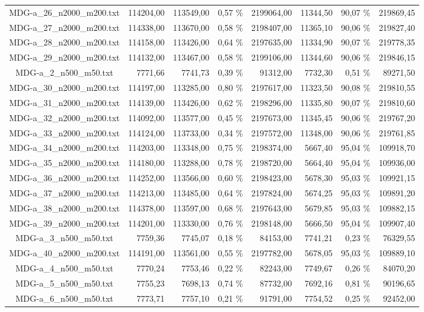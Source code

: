 \begin{landscape}
\begin{table}[ht]
\begin{tabular}{| c | r | r | r | r | r | r | r |  }
		MDG-a\_26\_n2000\_m200.txt&114204,00&113549,00&0,57 \%&2199064,00&11344,50&90,07 \%&219869,45\\
		MDG-a\_27\_n2000\_m200.txt&114338,00&113670,00&0,58 \%&2198407,00&11365,10&90,06 \%&219827,40\\
		MDG-a\_28\_n2000\_m200.txt&114158,00&113426,00&0,64 \%&2197635,00&11334,90&90,07 \%&219778,35\\
		MDG-a\_29\_n2000\_m200.txt&114132,00&113467,00&0,58 \%&2199106,00&11344,60&90,06 \%&219846,15\\
		MDG-a\_2\_n500\_m50.txt&7771,66&7741,73&0,39 \%&91312,00&7732,30&0,51 \%&89271,50\\
		MDG-a\_30\_n2000\_m200.txt&114197,00&113285,00&0,80 \%&2197617,00&11323,50&90,08 \%&219810,55\\
		MDG-a\_31\_n2000\_m200.txt&114139,00&113426,00&0,62 \%&2198296,00&11335,80&90,07 \%&219810,60\\
		MDG-a\_32\_n2000\_m200.txt&114092,00&113577,00&0,45 \%&2197673,00&11345,45&90,06 \%&219767,20\\
		MDG-a\_33\_n2000\_m200.txt&114124,00&113733,00&0,34 \%&2197572,00&11348,00&90,06 \%&219761,85\\
		MDG-a\_34\_n2000\_m200.txt&114203,00&113348,00&0,75 \%&2198374,00&5667,40&95,04 \%&109918,70\\
		MDG-a\_35\_n2000\_m200.txt&114180,00&113288,00&0,78 \%&2198720,00&5664,40&95,04 \%&109936,00\\
		MDG-a\_36\_n2000\_m200.txt&114252,00&113566,00&0,60 \%&2198423,00&5678,30&95,03 \%&109921,15\\
		MDG-a\_37\_n2000\_m200.txt&114213,00&113485,00&0,64 \%&2197824,00&5674,25&95,03 \%&109891,20\\
		MDG-a\_38\_n2000\_m200.txt&114378,00&113597,00&0,68 \%&2197643,00&5679,85&95,03 \%&109882,15\\
		MDG-a\_39\_n2000\_m200.txt&114201,00&113330,00&0,76 \%&2198148,00&5666,50&95,04 \%&109907,40\\
		MDG-a\_3\_n500\_m50.txt&7759,36&7745,07&0,18 \%&84153,00&7741,21&0,23 \%&76329,55\\
		MDG-a\_40\_n2000\_m200.txt&114191,00&113561,00&0,55 \%&2197782,00&5678,05&95,03 \%&109889,10\\
		MDG-a\_4\_n500\_m50.txt&7770,24&7753,46&0,22 \%&82243,00&7749,67&0,26 \%&84070,20\\
		MDG-a\_5\_n500\_m50.txt&7755,23&7698,13&0,74 \%&87732,00&7692,16&0,81 \%&90196,65\\
		MDG-a\_6\_n500\_m50.txt&7773,71&7757,10&0,21 \%&91791,00&7754,52&0,25 \%&92452,00\\

\end{tabular}
\end{table}
\end{landscape}
